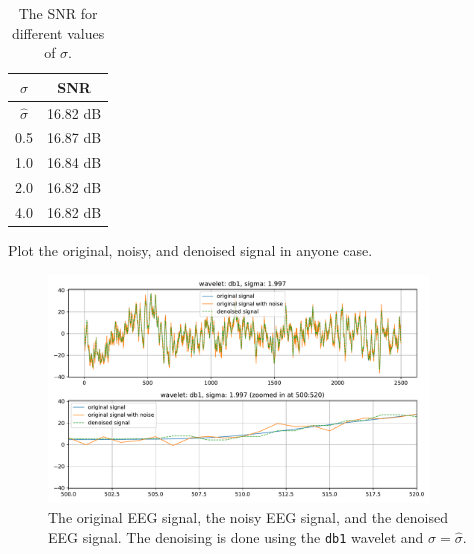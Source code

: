 \begin{table}[H]
    \label{tbl:snr_values_for_different_sigmas}
    \centering

    \begin{tabular}{c|c}
        \hline
        $\sigma$ & SNR \\
        \hline
        
        $\hat{\sigma}$ & 16.82 dB \\
        0.5 & 16.87 dB \\
        1.0 & 16.84 dB \\
        2.0 & 16.82 dB \\
        4.0 & 16.82 dB \\

    \end{tabular}

    \caption{The SNR for different values of $\sigma$.}
\end{table}



\begin{tcolorbox}[colback=blue!5!white,colframe=blue!75!black,title=Problem 3.b]
    Plot the original, noisy, and denoised signal in anyone case.
\end{tcolorbox}


\begin{figure}[H]
    \label{fig:problem3b_plot1}
    \centering
    \includegraphics[width=0.9\textwidth]{./img/problem3-denoised-signal-wavelet-db1-sigma-1.997.pdf}
    \caption{The original EEG signal, the noisy EEG signal, and the denoised EEG signal. The denoising is done using the \texttt{db1} wavelet and $\sigma = \hat{\sigma}$.}
\end{figure}


